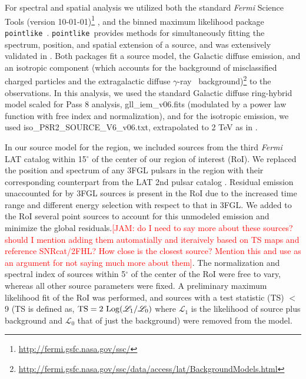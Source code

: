 \documentclass[preprint2]{aastex}
\newcommand{\kibitz}[2]{\ifnum\Comments=1\textcolor{#1}{#2}\fi}
\newcommand{\jamie}[1]{\kibitz{red}      {[JAM: #1]}}
\newcommand{\gam}{$\gamma$-ray}
\newcommand{\Fermi}{\emph{Fermi }}  %
\newcommand{\FermiLat}{\emph{Fermi} LAT }     %
\newcommand{\ptlike}{{\tt pointlike}}
\begin{document}
For spectral and spatial analysis we utilized both the standard \Fermi Science Tools (version 10-01-01)\footnote[1]{\url{http://fermi.gsfc.nasa.gov/ssc/}} , and the binned maximum likelihood package \ptlike~\citep{Kerr10}. \ptlike~provides methods for simultaneously fitting the spectrum, position, and spatial extension of a source, and was extensively validated in \cite{Lande12}. Both packages fit a source model, the Galactic diffuse emission, and an isotropic component (which accounts for the background of misclassified charged particles and the extragalactic diffuse \gam~ background)\footnote[2]{\url{http://fermi.gsfc.nasa.gov/ssc/data/access/lat/BackgroundModels.html}} to the observations. In this analysis, we used the standard Galactic diffuse ring-hybrid model scaled for Pass 8 analysis, gll{\_}iem{\_}v06.fits (modulated by a power law function with free index and normalization), and for the isotropic emission,  we used iso{\_}P8R2{\_}SOURCE{\_}V6{\_}v06.txt, extrapolated to 2 TeV as in \cite{2FHL}.

In our source model for the region, we included sources from the third \FermiLat catalog \citep[3FGL]{3FGL} within 15$^\circ$ of the center of our region of interest (RoI). We replaced the position and spectrum of any 3FGL pulsars in the region with their corresponding counterpart  from the LAT 2nd pulsar catalog \citep{2PC}.  Residual emission unaccounted for by 3FGL sources is present in the RoI due to the increased time range and different energy selection with respect to that in 3FGL. We added to the RoI several point sources to account for this unmodeled emission and minimize the global residuals.\jamie{do I need to say more about these sources? should I mention adding them automatially and iteraively based on TS maps and reference SNRcat/2FHL? How close is the closest source? Mention this and use as an argument for not saying much more about them}.  The normalization and spectral index of sources within 5$^{\circ}$ of the center of the RoI were free to vary, whereas all other source parameters were fixed. A preliminary maximum likelihood fit of the RoI was performed, and  sources with a test statistic (TS) $<$ 9 (TS is defined as,  ${\rm TS}=2~{\rm Log}(\mathcal{L}_1 / \mathcal{L}_0)$ where $\mathcal{L}_1$ 
 is the likelihood of source plus background and  $\mathcal{L}_0$ that of just the background) were removed from the model. 
\end{document}

